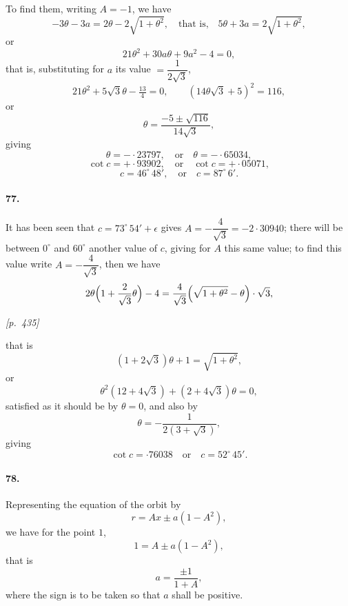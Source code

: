 \documentclass[11pt]{article}
\begin{document}
To find them, writing $A = -1$, we have
\[
-3\theta - 3a = 2\theta - 2\sqrt{1 + \theta^{2}},\quad\text{that is,}\quad 5\theta + 3a = 2\sqrt{1 + \theta^{2}},
\]
or
\[
21\theta^{2} + 30a\theta + 9a^{2} - 4 = 0,
\]
that is, substituting for $a$ its value $= \dfrac{1}{2\sqrt{3}}$,
\[
21\theta^{2} + 5\sqrt{3}\theta - \tfrac{13}{4} = 0,\qquad (14\theta\sqrt{3} + 5)^{2} = 116,
\]
or
\[
\theta = \dfrac{-5 \pm \sqrt{116}}{14\sqrt{3}},
\]
giving
\[
\theta = -{\cdot}23797,\quad\text{or}\quad \theta = -{\cdot}65034,
\]
\[
\cot c = +{\cdot}93902,\quad\text{or}\quad \cot c = +{\cdot}05071,
\]
\[
c = 46^{\circ}\,48',\quad\text{or}\quad c = 87^{\circ}\,6'.
\]

\paragraph{77.} It has been seen that $c = 73^{\circ}\,54' + \epsilon$ gives $A = -\dfrac{4}{\sqrt{3}} = -2{\cdot}30940$; there will be between $0^{\circ}$ and $60^{\circ}$ another value of $c$, giving for $A$ this same value; to find this value write $A = -\dfrac{4}{\sqrt{3}}$, then we have
\[
2\theta\Bigl(1 + \dfrac{2}{\sqrt{3}}\theta\Bigr) - 4 = \dfrac{4}{\sqrt{3}}\Bigl(\sqrt{1 + \theta^{2}} - \theta\Bigr)\cdot\sqrt{3},
\]

\medskip
\noindent\textit{[p.~435]}

\medskip

that is
\[
(1 + 2\sqrt{3})\theta + 1 = \sqrt{1 + \theta^{2}},
\]
or
\[
\theta^{2}(12 + 4\sqrt{3}) + (2 + 4\sqrt{3})\theta = 0,
\]
satisfied as it should be by $\theta = 0$, and also by
\[
\theta = -\dfrac{1}{2(3 + \sqrt{3})},
\]
giving
\[
\cot c = {\cdot}76038\quad\text{or}\quad c = 52^{\circ}\,45'.
\]

\paragraph{78.} Representing the equation of the orbit by
\[
r = Ax \pm a(1 - A^{2}),
\]
we have for the point $1$,
\[
1 = A \pm a(1 - A^{2}),
\]
that is
\[
a = \dfrac{\pm 1}{1 + A},
\]
where the sign is to be taken so that $a$ shall be positive.
\end{document}
